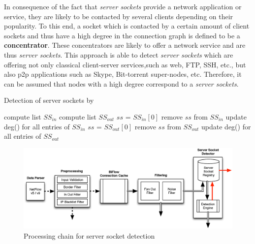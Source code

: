In consequence of the fact that \emph{server sockets} provide a network application or service, they are likely to be contacted by several clients depending on their popularity. To this end, a socket which is contacted by a certain amount of client sockets and thus have a high degree in the connection graph is defined to be a \textbf{concentrator}. These concentrators are likely to offer a network service and are thus \emph{server sockets}. 
This approach is able to detect \emph{server sockets} which are offering not only classical client-server services,such as web, FTP, SSH, etc., but also p2p applications such as Skype, Bit-torrent super-nodes, etc. 
Therefore, it can be assumed that nodes with a high degree correspond to a \emph{server sockets}.


\begin{algorithm}[t!]
\caption{Detection of server sockets by \citet{Schatzmann:Mining,Schatzmann:Dissection, Schatzmann:Tracing}}
\label{alg:service_tracing_ss-detection}
\begin{algorithmic}
\STATE
\STATE compute list $SS_{in}$ 
\STATE compute list $SS_{out}$ 
\STATE
{}
        \STATE $ss$ = $SS_{in}[0]$ 
        \STATE remove $ss$ from $SS_{in}$
        \STATE update deg() for all entries of $SS_{in}$
    \ENDWHILE
        \STATE $ss$ = $SS_{out}[0]$ 
        \STATE remove $ss$ from $SS_{out}$
        \STATE update deg() for all entries of $SS_{out}$
    \ENDWHILE
\ENDWHILE
\end{algorithmic}
\end{algorithm}

\begin{figure}
	[ht] \centering
	\includegraphics[width=\linewidth]{images/Detection_chain.eps}
	\caption{Processing chain for server socket detection} 
	\label{fig:detection_chain} 
\end{figure}

